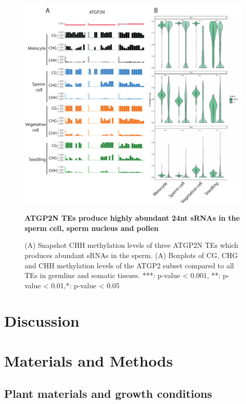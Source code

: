 \begin{figure}[htbp!] 
\centering    
    \includegraphics[width=1\textwidth]{Chapter2/Figs/Figure14_TE_methylation.pdf}
\caption{\textbf{ATGP2N TEs produce highly abundant 24nt sRNAs in the sperm cell, sperm nucleus and pollen}}
\label{fig:TE_methylation}
\captionsetup{font=small}
    \caption*{(A) Snapshot CHH methylation levels of three ATGP2N TEs which produces abundant sRNAs in the sperm. (A) Boxplots of CG, CHG and CHH methylation levels of the ATGP2 subset compared to all TEs in germline and somatic tissues. ***: p-value < 0.001, **: p-value < 0.01,*: p-value < 0.05}
\end{figure}

\clearpage

\section{Discussion}

\clearpage

\section{Materials and Methods}

\subsection{Plant materials and growth conditions}

